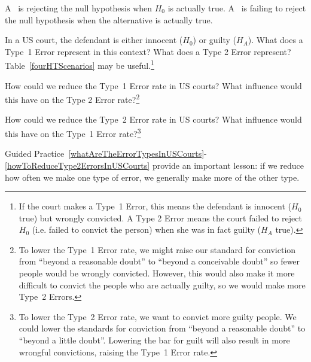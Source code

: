 \begin{termBox}{
A~ is rejecting the null hypothesis when $H_0$ is actually true. A~ is failing to reject the null hypothesis when the alternative is actually true.}
\end{termBox}

\begin{exercise} \label{whatAreTheErrorTypesInUSCourts}
In a US court, the defendant is either innocent ($H_0$) or  guilty ($H_A$). What does a Type~1 Error represent in this context? What does a Type 2 Error represent? Table~\ref{fourHTScenarios} may be useful.\footnote{If the court makes a Type~1 Error, this means the defendant is innocent ($H_0$ true) but wrongly convicted. A Type 2 Error means the court failed to reject $H_0$ (i.e. failed to convict the person) when she was in fact guilty ($H_A$ true).}
\end{exercise}

\begin{exercise} \label{howToReduceType1ErrorsInUSCourts}
How could we reduce the Type~1 Error rate in US courts? What influence would this have on the Type 2 Error rate?\footnote{To lower the Type~1 Error rate, we might raise our standard for conviction from ``beyond a reasonable doubt'' to ``beyond a conceivable doubt'' so fewer people would be wrongly convicted. However, this would also make it more difficult to convict the people who are actually guilty, so we would make more Type~2 Errors.}
\end{exercise}

\begin{exercise} \label{howToReduceType2ErrorsInUSCourts}
How could we reduce the Type~2 Error rate in US courts? What influence would this have on the Type~1 Error rate?\footnote{To lower the Type~2 Error rate, we want to convict more guilty people. We could lower the standards for conviction from ``beyond a reasonable doubt'' to ``beyond a little doubt''. Lowering the bar for guilt will also result in more wrongful convictions, raising the Type~1 Error rate.}
\end{exercise}


Guided Practice~\ref{whatAreTheErrorTypesInUSCourts}-\ref{howToReduceType2ErrorsInUSCourts} provide an important lesson: if we reduce how often we make one type of error, we generally make more of the other type.

